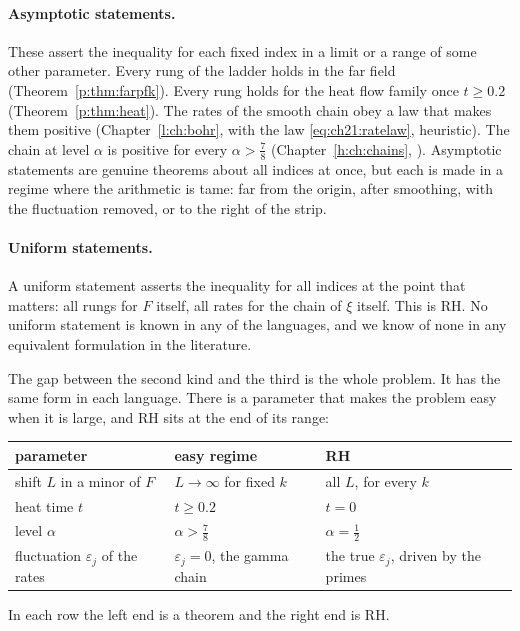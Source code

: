 \paragraph{Asymptotic statements.} These assert the inequality for each fixed index in a limit or a range of some other parameter. Every rung of the ladder holds in the far field (Theorem~\ref{p:thm:farpfk}). Every rung holds for the heat flow family once $t\ge0.2$ (Theorem~\ref{p:thm:heat}). The rates of the smooth chain obey a law that makes them positive (Chapter~\ref{l:ch:bohr}, with the law \eqref{eq:ch21:ratelaw}, heuristic). The chain at level $\alpha$ is positive for every $\alpha>\frac78$ (Chapter~\ref{h:ch:chains}, \cite{OAI26a}). Asymptotic statements are genuine theorems about all indices at once, but each is made in a regime where the arithmetic is tame: far from the origin, after smoothing, with the fluctuation removed, or to the right of the strip.

\paragraph{Uniform statements.} A uniform statement asserts the inequality for all indices at the point that matters: all rungs for $F$ itself, all rates for the chain of $\xi$ itself. This is RH. No uniform statement is known in any of the languages, and we know of none in any equivalent formulation in the literature.

The gap between the second kind and the third is the whole problem. It has the same form in each language. There is a parameter that makes the problem easy when it is large, and RH sits at the end of its range:
\begin{center}\small
\begin{tabular}{@{}p{}p{}p{}@{}}
\toprule
parameter & easy regime & RH\\
\midrule
shift $L$ in a minor of $F$ & $L\to\infty$ for fixed $k$ & all $L$, for every $k$\\
heat time $t$ & $t\ge0.2$ & $t=0$\\
level $\alpha$ & $\alpha>\frac78$ & $\alpha=\frac12$\\
fluctuation $\varepsilon_j$ of the rates & $\varepsilon_j=0$, the gamma chain & the true $\varepsilon_j$, driven by the primes\\
\bottomrule
\end{tabular}
\end{center}
In each row the left end is a theorem and the right end is RH.

